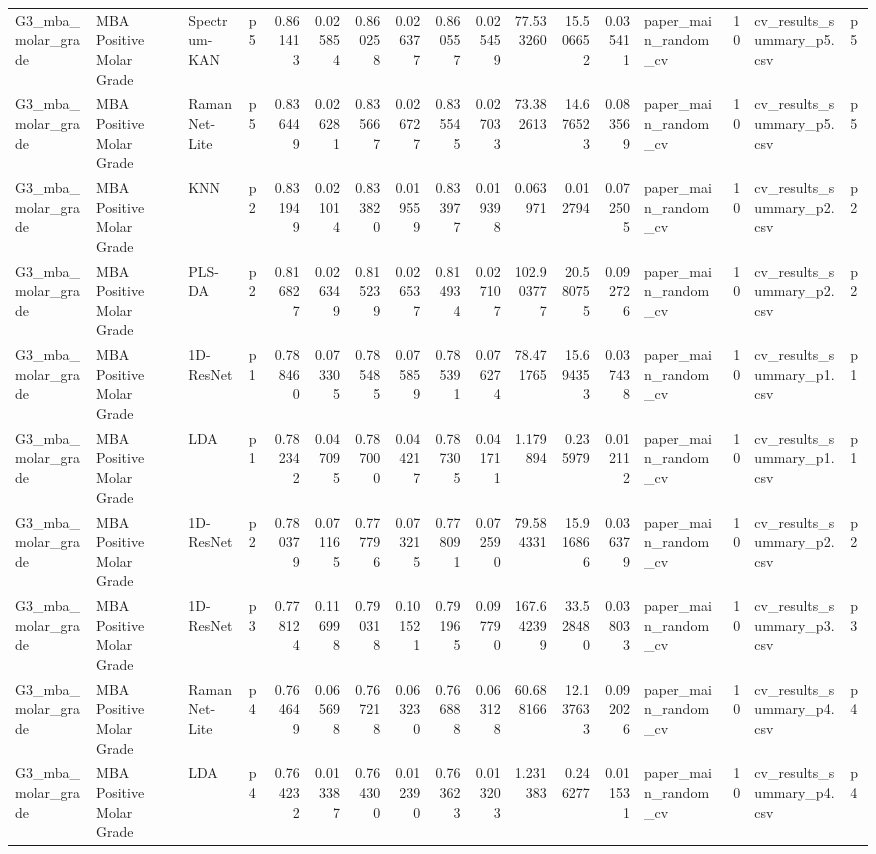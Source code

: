 \begin{tabular}{llllrrrrrrrrrlrll}
G3_mba_molar_grade & MBA Positive Molar Grade & Spectrum-KAN & p5 & 0.861413 & 0.025854 & 0.860258 & 0.026377 & 0.860557 & 0.025459 & 77.533260 & 15.506652 & 0.035411 & paper_main_random_cv & 10 & cv_results_summary_p5.csv & p5 \\
G3_mba_molar_grade & MBA Positive Molar Grade & RamanNet-Lite & p5 & 0.836449 & 0.026281 & 0.835667 & 0.026727 & 0.835545 & 0.027033 & 73.382613 & 14.676523 & 0.083569 & paper_main_random_cv & 10 & cv_results_summary_p5.csv & p5 \\
G3_mba_molar_grade & MBA Positive Molar Grade & KNN & p2 & 0.831949 & 0.021014 & 0.833820 & 0.019559 & 0.833977 & 0.019398 & 0.063971 & 0.012794 & 0.072505 & paper_main_random_cv & 10 & cv_results_summary_p2.csv & p2 \\
G3_mba_molar_grade & MBA Positive Molar Grade & PLS-DA & p2 & 0.816827 & 0.026349 & 0.815239 & 0.026537 & 0.814934 & 0.027107 & 102.903777 & 20.580755 & 0.092726 & paper_main_random_cv & 10 & cv_results_summary_p2.csv & p2 \\
G3_mba_molar_grade & MBA Positive Molar Grade & 1D-ResNet & p1 & 0.788460 & 0.073305 & 0.785485 & 0.075859 & 0.785391 & 0.076274 & 78.471765 & 15.694353 & 0.037438 & paper_main_random_cv & 10 & cv_results_summary_p1.csv & p1 \\
G3_mba_molar_grade & MBA Positive Molar Grade & LDA & p1 & 0.782342 & 0.047095 & 0.787000 & 0.044217 & 0.787305 & 0.041711 & 1.179894 & 0.235979 & 0.012112 & paper_main_random_cv & 10 & cv_results_summary_p1.csv & p1 \\
G3_mba_molar_grade & MBA Positive Molar Grade & 1D-ResNet & p2 & 0.780379 & 0.071165 & 0.777796 & 0.073215 & 0.778091 & 0.072590 & 79.584331 & 15.916866 & 0.036379 & paper_main_random_cv & 10 & cv_results_summary_p2.csv & p2 \\
G3_mba_molar_grade & MBA Positive Molar Grade & 1D-ResNet & p3 & 0.778124 & 0.116998 & 0.790318 & 0.101521 & 0.791965 & 0.097790 & 167.642399 & 33.528480 & 0.038033 & paper_main_random_cv & 10 & cv_results_summary_p3.csv & p3 \\
G3_mba_molar_grade & MBA Positive Molar Grade & RamanNet-Lite & p4 & 0.764649 & 0.065698 & 0.767218 & 0.063230 & 0.766888 & 0.063128 & 60.688166 & 12.137633 & 0.092026 & paper_main_random_cv & 10 & cv_results_summary_p4.csv & p4 \\
G3_mba_molar_grade & MBA Positive Molar Grade & LDA & p4 & 0.764232 & 0.013387 & 0.764300 & 0.012390 & 0.763623 & 0.013203 & 1.231383 & 0.246277 & 0.011531 & paper_main_random_cv & 10 & cv_results_summary_p4.csv & p4 \\

\end{tabular}
